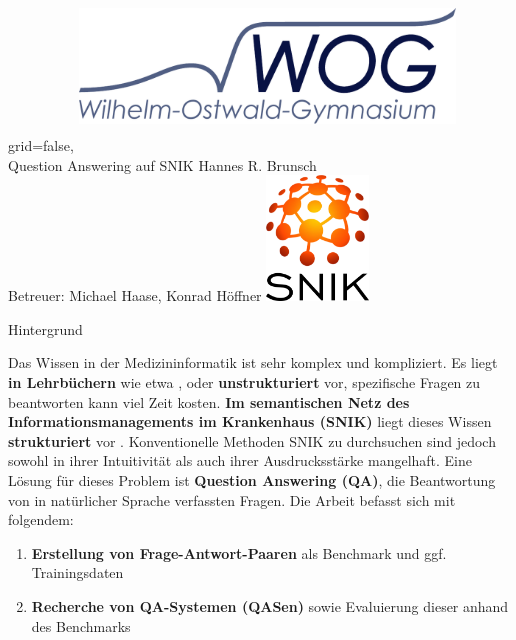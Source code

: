 \documentclass[portrait,final,a0paper,fontscale=0.320]{imiseposter}
\begin{document}
\small

\begin{poster}%
  {grid=false,}
  {\hspace{3em}\includegraphics[height=4.5cm, width=10cm, keepaspectratio]{img/logos/wog-logo-mit-text.pdf}} 
  {Question Answering auf SNIK}
  {Hannes R. Brunsch\\
  Betreuer: Michael Haase, Konrad H{\"o}ffner}
  {\includegraphics[height=9.0em]{img/logos/snik-logo.png}}

\begin{posterbox}[name=background,column=0,row=0]{Hintergrund}

Das Wissen in der Medizininformatik ist sehr komplex und kompliziert.
Es liegt \textbf{in Lehrbüchern} wie etwa \cite{bb}, \cite{ob} oder \cite{he} \textbf{unstrukturiert} vor, spezifische Fragen zu beantworten kann viel Zeit kosten.
\textbf{Im semantischen Netz des Informationsmanagements im Krankenhaus (SNIK)} liegt dieses Wissen \textbf{strukturiert} vor \cite{snik}.
Konventionelle Methoden SNIK zu durchsuchen sind jedoch sowohl in ihrer Intuitivität als auch ihrer Ausdrucksstärke mangelhaft.
Eine Lösung für dieses Problem ist \textbf{Question Answering (QA)}, die Beantwortung von in natürlicher Sprache verfassten Fragen.
Die Arbeit befasst sich mit folgendem:
\begin{enumerate}
  \item \textbf{Erstellung von Frage-Antwort-Paaren} als Benchmark und ggf. Trainingsdaten
  \item \textbf{Recherche von QA-Systemen (QASen)} sowie Evaluierung dieser anhand des Benchmarks
\end{enumerate}


\end{posterbox}
\end{poster}
\end{document}
